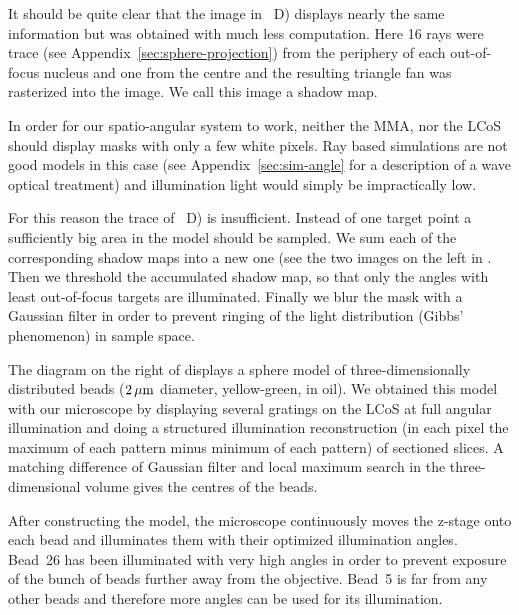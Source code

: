 It should be quite clear that the image in
~D) displays nearly the same information
but was obtained with much less computation.  Here 16 rays were trace
(see Appendix~\ref{sec:sphere-projection}) from the periphery of each
out-of-focus nucleus and one from the centre and the resulting
triangle fan was rasterized into the image. We call this image a
shadow map.


In order for our spatio-angular system to work, neither the MMA, nor
the LCoS should display masks with only a few white pixels. Ray based
simulations are not good models in this case (see
Appendix~\ref{sec:sim-angle} for a description of a wave optical
treatment) and illumination light would simply be impractically low.

For this reason the trace of ~D) is
insufficient. Instead of one target point a sufficiently big area in
the model should be sampled. We sum each of the corresponding shadow
maps into a new one (see the two images on the left in
. Then we threshold the
accumulated shadow map, so that only the angles with least
out-of-focus targets are illuminated. Finally we blur the mask with a
Gaussian filter in order to prevent ringing of the light distribution
(Gibbs' phenomenon) in sample space.

The diagram on the right of 
displays a sphere model of three-dimensionally distributed beads
($\unit[2]{\mu m}$ diameter, yellow-green, in oil). We obtained this
model with our microscope by displaying several gratings on the LCoS
at full angular illumination and doing a structured illumination
reconstruction (in each pixel the maximum of each pattern minus minimum
of each pattern) of sectioned slices. A matching difference of
Gaussian filter and local maximum search in the three-dimensional
volume gives the centres of the beads.

After constructing the model, the microscope continuously moves the
z-stage onto each bead and illuminates them with their optimized
illumination angles. Bead~26 has been illuminated with very high
angles in order to prevent exposure of the bunch of beads further away
from the objective. Bead~5 is far from any other beads and therefore
more angles can be used for its illumination.



